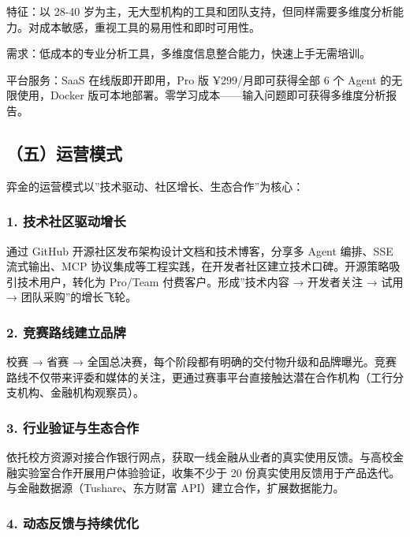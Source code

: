 \documentclass[
]{ctexart}
\begin{document}
特征：以 28-40
岁为主，无大型机构的工具和团队支持，但同样需要多维度分析能力。对成本敏感，重视工具的易用性和即时可用性。

需求：低成本的专业分析工具，多维度信息整合能力，快速上手无需培训。

平台服务：SaaS 在线版即开即用，Pro 版 ¥299/月即可获得全部 6 个 Agent
的无限使用，Docker
版可本地部署。零学习成本------输入问题即可获得多维度分析报告。

\subsection{（五）运营模式}\label{ux4e94ux8fd0ux8425ux6a21ux5f0f}

弈金的运营模式以''技术驱动、社区增长、生态合作''为核心：

\subsubsection{1.
技术社区驱动增长}\label{ux6280ux672fux793eux533aux9a71ux52a8ux589eux957f}

通过 GitHub 开源社区发布架构设计文档和技术博客，分享多 Agent 编排、SSE
流式输出、MCP
协议集成等工程实践，在开发者社区建立技术口碑。开源策略吸引技术用户，转化为
Pro/Team 付费客户。形成''技术内容 → 开发者关注 → 试用 →
团队采购''的增长飞轮。

\subsubsection{2.
竞赛路线建立品牌}\label{ux7adeux8d5bux8defux7ebfux5efaux7acbux54c1ux724c}

校赛 → 省赛 →
全国总决赛，每个阶段都有明确的交付物升级和品牌曝光。竞赛路线不仅带来评委和媒体的关注，更通过赛事平台直接触达潜在合作机构（工行分支机构、金融机构观察员）。

\subsubsection{3.
行业验证与生态合作}\label{ux884cux4e1aux9a8cux8bc1ux4e0eux751fux6001ux5408ux4f5c}

依托校方资源对接合作银行网点，获取一线金融从业者的真实使用反馈。与高校金融实验室合作开展用户体验验证，收集不少于
20 份真实使用反馈用于产品迭代。与金融数据源（Tushare、东方财富
API）建立合作，扩展数据能力。

\subsubsection{4.
动态反馈与持续优化}\label{ux52a8ux6001ux53cdux9988ux4e0eux6301ux7eedux4f18ux5316}
\end{document}
